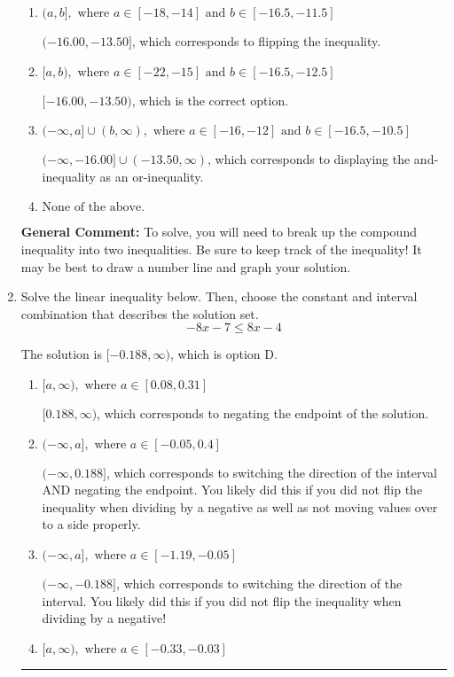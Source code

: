 \documentclass{extbook}[14pt]
\newcommand{\litem}[1]{\item #1

\rule{\textwidth}{0.4pt}}
\begin{document}
\begin{enumerate}
{\begin{enumerate}[label=\Alph*.]
$(-\infty, -16.00) \cup [-13.50, \infty)$, which corresponds to displaying the and-inequality as an or-inequality AND flipping the inequality.
\item \( (a, b], \text{ where } a \in [-18, -14] \text{ and } b \in [-16.5, -11.5] \)

$(-16.00, -13.50]$, which corresponds to flipping the inequality.
\item \( [a, b), \text{ where } a \in [-22, -15] \text{ and } b \in [-16.5, -12.5] \)

$[-16.00, -13.50)$, which is the correct option.
\item \( (-\infty, a] \cup (b, \infty), \text{ where } a \in [-16, -12] \text{ and } b \in [-16.5, -10.5] \)

$(-\infty, -16.00] \cup (-13.50, \infty)$, which corresponds to displaying the and-inequality as an or-inequality.
\item \( \text{None of the above.} \)


\end{enumerate}

\textbf{General Comment:} To solve, you will need to break up the compound inequality into two inequalities. Be sure to keep track of the inequality! It may be best to draw a number line and graph your solution.
}
\litem{
Solve the linear inequality below. Then, choose the constant and interval combination that describes the solution set.
\[ -8x -7 \leq 8x -4 \]

The solution is \( [-0.188, \infty) \), which is option D.\begin{enumerate}[label=\Alph*.]
\item \( [a, \infty), \text{ where } a \in [0.08, 0.31] \)

 $[0.188, \infty)$, which corresponds to negating the endpoint of the solution.
\item \( (-\infty, a], \text{ where } a \in [-0.05, 0.4] \)

 $(-\infty, 0.188]$, which corresponds to switching the direction of the interval AND negating the endpoint. You likely did this if you did not flip the inequality when dividing by a negative as well as not moving values over to a side properly.
\item \( (-\infty, a], \text{ where } a \in [-1.19, -0.05] \)

 $(-\infty, -0.188]$, which corresponds to switching the direction of the interval. You likely did this if you did not flip the inequality when dividing by a negative!
\item \( [a, \infty), \text{ where } a \in [-0.33, -0.03] \)


\end{enumerate}}
\end{enumerate}
\end{document}
